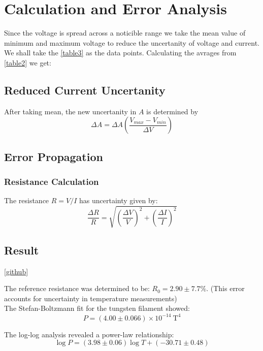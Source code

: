 \documentclass[%
 sor,
 jor,
 amsmath,amssymb,
 reprint,%
]{revtex4-2}
\begin{document}
\section{Calculation and Error Analysis}
Since the voltage is spread across a noticible range we take the mean value of minimum and maximum voltage to reduce the uncertanity of voltage and current. We shall take the \ref{table3} as the data points. Calculating the avrages from \ref{table2} we get:\\

\subsection{Reduced Current Uncertanity}
After taking mean, the new uncertanity in $A$ is determined by $$\Delta A = \Delta A \left( \frac{V_{max} - V_{min}}{\Delta V} \right)$$
\subsection{Error Propagation}
\subsubsection{Resistance Calculation}
The resistance $R = V/I$ has uncertainty given by:
\begin{equation}
    \frac{\Delta R}{R} = \sqrt{\left(\frac{\Delta V}{V}\right)^2 + \left(\frac{\Delta I}{I}\right)^2}
\end{equation}




\subsection{Result}
\ref{github}

The reference resistance was determined to be: $R_0 = 2.90 \pm 7.7\% $. (This error accounts for uncertainty in temperature measurements)\\

The Stefan-Boltzmann fit for the tungsten filament showed:
$$
P = (4.00 \pm 0.066) \times 10^{-14}\ \mathrm{T^4}
$$

The log-log analysis revealed a power-law relationship:
$$
\log P = (3.98 \pm 0.06)\log T + (-30.71 \pm 0.48)
$$

\noindent{}\\
\\
\end{document}
